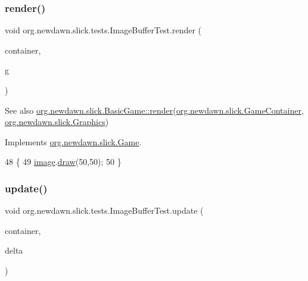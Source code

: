 \subsubsection{\texorpdfstring{render()}{render()}}
{\footnotesize\ttfamily void org.\+newdawn.\+slick.\+tests.\+Image\+Buffer\+Test.\+render (\begin{DoxyParamCaption}\item[{\mbox{\hyperlink{classorg_1_1newdawn_1_1slick_1_1_game_container}{Game\+Container}}}]{container,  }\item[{\mbox{\hyperlink{classorg_1_1newdawn_1_1slick_1_1_graphics}{Graphics}}}]{g }\end{DoxyParamCaption})\hspace{0.3cm}{\ttfamily [inline]}}

\begin{DoxySeeAlso}{See also}
\mbox{\hyperlink{interfaceorg_1_1newdawn_1_1slick_1_1_game_af1a4670d43eb3ba04dfcf55ab1975b64}{org.\+newdawn.\+slick.\+Basic\+Game\+::render}}(\mbox{\hyperlink{classorg_1_1newdawn_1_1slick_1_1_game_container}{org.\+newdawn.\+slick.\+Game\+Container}}, \mbox{\hyperlink{classorg_1_1newdawn_1_1slick_1_1_graphics}{org.\+newdawn.\+slick.\+Graphics}}) 
\end{DoxySeeAlso}


Implements \mbox{\hyperlink{interfaceorg_1_1newdawn_1_1slick_1_1_game_af1a4670d43eb3ba04dfcf55ab1975b64}{org.\+newdawn.\+slick.\+Game}}.


\begin{DoxyCode}
48                                                             \{
49         \mbox{\hyperlink{classorg_1_1newdawn_1_1slick_1_1tests_1_1_image_buffer_test_afde40a9c63dc29ce4951b86e0a721c8a}{image}}.\mbox{\hyperlink{classorg_1_1newdawn_1_1slick_1_1_image_a9bddcca05c7140ab45df8ac5b250b6cd}{draw}}(50,50);
50     \}
\end{DoxyCode}
\mbox{\label{classorg_1_1newdawn_1_1slick_1_1tests_1_1_image_buffer_test_a05c50b58b7ebc8202f95ae6735eca2b9}} 
\subsubsection{\texorpdfstring{update()}{update()}}
{\footnotesize\ttfamily void org.\+newdawn.\+slick.\+tests.\+Image\+Buffer\+Test.\+update (\begin{DoxyParamCaption}\item[{\mbox{\hyperlink{classorg_1_1newdawn_1_1slick_1_1_game_container}{Game\+Container}}}]{container,  }\item[{int}]{delta }\end{DoxyParamCaption})\hspace{0.3cm}{\ttfamily [inline]}}

